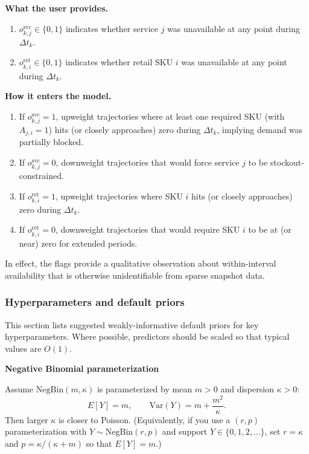 \documentclass[11pt]{article}
\begin{document}
\textbf{What the user provides.}
\begin{enumerate}
  \item $o^{\mathrm{svc}}_{k,j}\in\{0,1\}$ indicates whether service $j$ was unavailable at any point during $\Delta t_k$.
  \item $o^{\mathrm{ret}}_{k,i}\in\{0,1\}$ indicates whether retail SKU $i$ was unavailable at any point during $\Delta t_k$.
\end{enumerate}

\textbf{How it enters the model.}
\begin{enumerate}
  \item If $o^{\mathrm{svc}}_{k,j}=1$, upweight trajectories where at least one required SKU (with $A_{j,i}=1$) hits (or closely approaches) zero during $\Delta t_k$, implying demand was partially blocked.
  \item If $o^{\mathrm{svc}}_{k,j}=0$, downweight trajectories that would force service $j$ to be stockout-constrained.

  \item If $o^{\mathrm{ret}}_{k,i}=1$, upweight trajectories where SKU $i$ hits (or closely approaches) zero during $\Delta t_k$.
  \item If $o^{\mathrm{ret}}_{k,i}=0$, downweight trajectories that would require SKU $i$ to be at (or near) zero for extended periods.
\end{enumerate}

In effect, the flags provide a qualitative observation about within-interval availability that is otherwise unidentifiable from sparse snapshot data.

\subsubsection*{Hyperparameters and default priors}\label{sec:hyperparams}

This section lists suggested weakly-informative default priors for key hyperparameters.
Where possible, predictors should be scaled so that typical values are $O(1)$.

\textbf{Negative Binomial parameterization}

Assume $\text{NegBin}(m,\kappa)$ is parameterized by mean $m>0$ and dispersion $\kappa>0$:
\[
  E[Y]=m,\qquad \mathrm{Var}(Y)=m + \frac{m^2}{\kappa}.
\]
Then larger $\kappa$ is closer to Poisson.
(Equivalently, if you use a $(r,p)$ parameterization with $Y\sim\text{NegBin}(r,p)$ and support $Y\in\{0,1,2,\dots\}$, set
$r=\kappa$ and $p=\kappa/(\kappa+m)$ so that $E[Y]=m$.)
\end{document}
